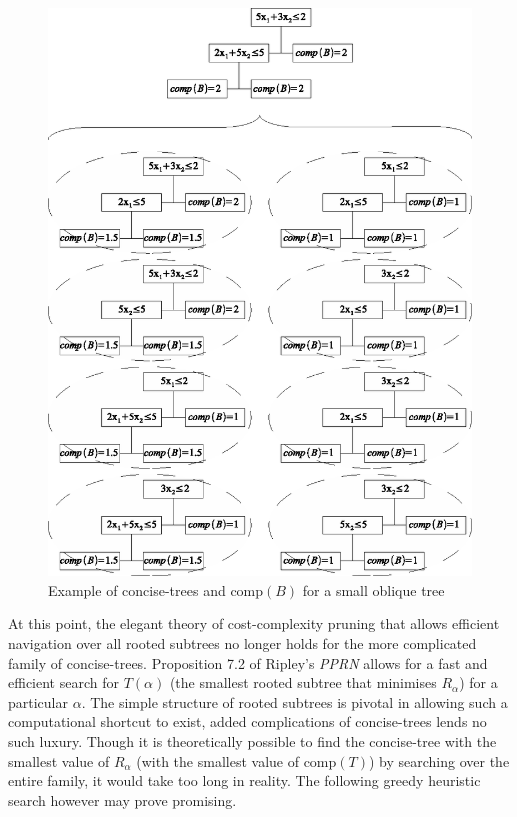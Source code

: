 \begin{figure}
\centering
\includegraphics*[viewport=0 0 340 455]{figconcisetreesandcomp.eps}
\caption{Example of concise-trees and $\mbox{comp}(B)$ for a small oblique tree}
\label{fig:concisetreesandcomp}
\end{figure}

At this point, the elegant theory of cost-complexity pruning that allows efficient navigation over all rooted subtrees no longer holds for the more complicated family of concise-trees. Proposition 7.2 of Ripley's \emph{PPRN} allows for a fast and efficient search for $T(\alpha)$ (the smallest rooted subtree that minimises $R_\alpha$) for a particular $\alpha$. The simple structure of rooted subtrees is pivotal in allowing such a computational shortcut to exist, added complications of concise-trees lends no such luxury. Though it is theoretically possible to find the concise-tree with the smallest value of $R_\alpha$ (with the smallest value of $\mbox{comp}(T)$) by searching over the entire family, it would take too long in reality. The following greedy heuristic search however may prove promising.\\ 

